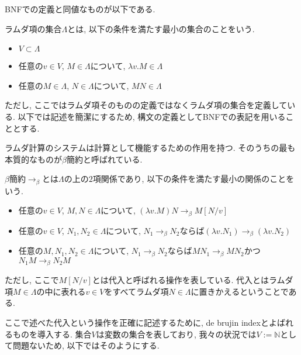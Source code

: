 \documentclass{ltjsarticle}
\begin{document}
BNFでの定義と同値なものが以下である.

\begin{defn}
 ラムダ項の集合$\Lambda$とは, 以下の条件を満たす最小の集合のことをいう.
 \begin{itemize}
  \item $V \subset \Lambda$
  \item 任意の$v \in V$, $M \in \Lambda$について, $\lambda v. M \in \Lambda$
  \item 任意の$M \in \Lambda$, $N \in \Lambda$について, $M N \in \Lambda$
 \end{itemize}
\end{defn}

ただし, ここではラムダ項そのものの定義ではなくラムダ項の集合を定義している. 以下では記述を簡潔にするため, 構文の定義としてBNFでの表記を用いることとする.

ラムダ計算のシステムは計算として機能するための作用を持つ. そのうちの最も本質的なものが$\beta$簡約と呼ばれている.

\begin{defn}
 $\beta$簡約$\rightarrow_{\beta}$とは$\Lambda$の上の$2$項関係であり, 以下の条件を満たす最小の関係のことをいう.
 \begin{itemize}
  \item 任意の$v \in V$, $M, N \in \Lambda$について, $(\lambda v. M) N \rightarrow_\beta M[N/v]$
  \item 任意の$v \in V$, $N_1, N_2 \in \Lambda$について, $N_1 \rightarrow_\beta N_2$ならば$(\lambda v. N_1) \rightarrow_\beta (\lambda v. N_2)$
  \item 任意の$M, N_1, N_2 \in \Lambda$について, $N_1 \rightarrow_\beta N_2$ならば$M N_1 \rightarrow_\beta M N_2$かつ$N_1 M \rightarrow_\beta N_2 M$
 \end{itemize}
 ただし, ここで$M[N/v]$とは代入と呼ばれる操作を表している. 代入とはラムダ項$M \in \Lambda$の中に表れる$v \in V$をすべてラムダ項$N \in \Lambda$に置きかえるということである.
\end{defn}

ここで述べた代入という操作を正確に記述するために, de brujin indexとよばれるものを導入する.
集合$V$は変数の集合を表しており, 我々の状況では$V := \mathbb{N}$として問題ないため, 以下ではそのようにする.
\end{document}
